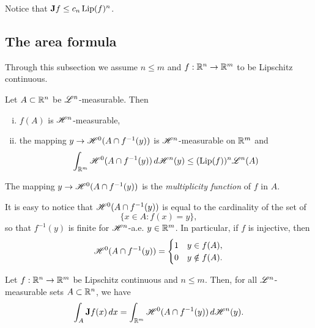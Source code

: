 \begin{remark}
Notice that ${\bf J} f \le c_n \operatorname{Lip}(f)^{n}$.
\end{remark}

\subsection{The area formula}

Through this subsection we assume $n \le m$ and $f : \mathbb{R}^{n} \to \mathbb{R}^{m}$ to be Lipschitz continuous.

\begin{lemma} Let $A \subset \mathbb{R}^{n}$ be $\mathscr{L}^{n}$-measurable. Then
\begin{enumerate}[i)]
\item $f(A)$ is $\mathscr{H}^{n}$-measurable,
\item the mapping $y \to \mathscr{H}^{0}(A \cap f^{-1}(y))$ is $\mathscr{H}^{n}$-measurable on $\mathbb{R}^{m}$ and
\begin{equation*}
\int_{\mathbb{R}^{m}} \mathscr{H}^{0}(A \cap f^{-1}(y)) \, d \mathscr{H}^{n}(y) \le (\operatorname{Lip}(f))^{n} \mathscr{L}^{n}(A)
\end{equation*}
\end{enumerate}
\end{lemma}

\begin{definition}
The mapping $y \to \mathscr{H}^{0}(A \cap f^{-1}(y))$ is the {\em multiplicity function} of $f$ in $A$.
\end{definition}

\begin{remark}
It is easy to notice that $\mathscr{H}^{0}(A \cap f^{-1}(y))$ is equal to the cardinality of the set of $$\{ x \in A : f(x) = y \},$$
so that $f^{-1}(y)$ is finite for $\mathscr{H}^{n}$-a.e. $y \in \mathbb{R}^{m}$.
In particular, if $f$ is injective, then
\begin{equation*}
\mathscr{H}^{0}(A \cap f^{-1}(y)) = \begin{cases} 1 & y \in f(A), \\
0 & y \notin f(A).
\end{cases}
\end{equation*}
\end{remark}

\begin{theorem} \label{area_formula}
Let $f : \mathbb{R}^{n} \to \mathbb{R}^{m}$ be Lipschitz continuous and $n \le m$. Then, for all $\mathscr{L}^{n}$-measurable sets $A \subset \mathbb{R}^{n}$, we have
\begin{equation} \label{eq:area_formula}
\int_{A} {\bf J} f(x) \, dx = \int_{\mathbb{R}^{m}} \mathscr{H}^{0}(A \cap f^{-1}(y)) \, d\mathscr{H}^{n}(y).
\end{equation}
\end{theorem}

